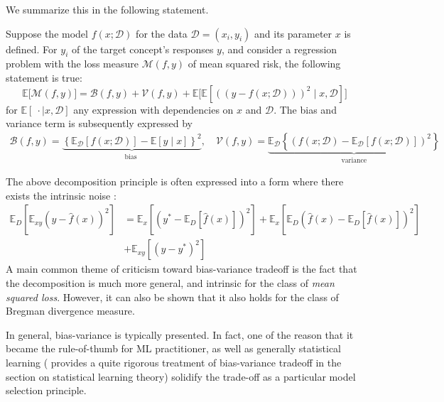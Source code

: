 We summarize this in the following statement. 

\begin{theorem}
    Suppose the model $f(x;\mathcal{D})$ for the data $\mathcal{D}=(x_i, y_i)$ and its parameter $x$ is defined. For $y_{i}$ of the target concept's responses $y$, and consider a regression problem with the loss measure $\mathcal{M}(f,y)$ of mean squared risk, the following statement is true: \begin{equation}
        \mathbb{E}\big[\mathcal{M}(f,y)\big] = \mathcal{B}(f,y) + \mathcal{V}(f,y) + \mathbb{E}\Big[\mathbb{E} \left[((y-f(x;\mathcal{D})))^{2}\mid x, \mathcal{D}\right]\Big]
    \end{equation}
    for $\mathbb{E}[\:\cdot\mid x, \mathcal{D}]$ any expression with dependencies on $x$ and $\mathcal{D}$. The bias and variance term is subsequently expressed by 
    \begin{align}
        \mathcal{B}(f,y) = \underbrace{\left\{ \mathbb{E}_{\mathcal{D}}[f(x;\mathcal{D})] - \mathbb{E}[y\mid x] \right\}^{2}}_{\text{bias }}, \quad \mathcal{V}(f,y) =\underbrace{\mathbb{E}_{\mathcal{D}} \left\{(f(x;\mathcal{D})- \mathbb{E}_{\mathcal{D}}[f(x;\mathcal{D})])^{2}\right\}}_{\text{variance}}
    \end{align}
\end{theorem}

The above decomposition principle is often expressed into a form where there exists the intrinsic noise \cite{brown2024biasvariance}: 
\begin{equation}
    \begin{split}
        \mathbb{E}_D \left[ \mathbb{E}_{xy} \left( y - \hat{f}(x) \right)^2 \right]
        &= 
         \mathbb{E}_x \left[ \left( y^* - \mathbb{E}_D[\hat{f}(x)] \right)^2 \right]
        + \mathbb{E}_x \left[ \mathbb{E}_D \left( \hat{f}(x) - \mathbb{E}_D[\hat{f}(x)] \right)^2 \right] \\
        &+ \mathbb{E}_{xy} \left[ \left( y - y^* \right)^2 \right]
    \end{split}
    \end{equation}
A main common theme of criticism toward bias-variance tradeoff is the fact that the decomposition is much more general, and intrinsic for the class of \textit{mean squared loss}. However, it can also be shown \cite{brown2024biasvariance,PfauBregmanDivergence} that it also holds for the class of Bregman divergence measure. 

In general, bias-variance is typically presented. In fact, one of the reason that it became the rule-of-thumb for ML practitioner, as well as generally statistical learning (\cite{lafon_understanding_2024} provides a quite rigorous treatment of bias-variance tradeoff in the section on statistical learning theory) solidify the trade-off as a particular model selection principle. 

